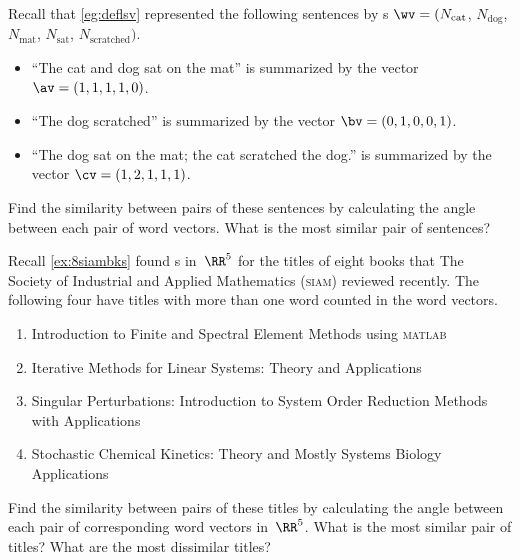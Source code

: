 \begin{exercise}  
Recall that \cref{eg:deflsv} represented the following sentences by s \(\wv=(N_{\text{cat}}\), \(N_{\text{dog}}\), \(N_{\text{mat}}\), \(N_{\text{sat}}\), \(N_{\text{scratched}})\).
\begin{itemize}
\item ``The cat and dog sat on the mat'' is summarized by the vector \(\av=(1,1,1,1,0)\).
\item ``The dog scratched'' is summarized by the vector \(\bv=(0,1,0,0,1)\).
\item  ``The dog sat on the mat; the cat scratched the dog.'' is summarized by the vector \(\cv=(1,2,1,1,1)\).
\end{itemize}
Find the similarity between pairs of these sentences by calculating the angle between each pair of word vectors.  
What is the most similar pair of sentences?

\end{exercise}



\begin{OmitV1}
\begin{exercise}  
Recall \cref{ex:8siambks} found s in~\(\RR^5\) for the titles of eight books that The Society of Industrial and Applied Mathematics (\textsc{siam}) reviewed recently.
The following four have titles with more than one word counted in the word vectors.
\begin{enumerate}
\item Introduction to Finite and Spectral Element Methods using \textsc{matlab}
\item Iterative Methods for Linear Systems: Theory and Applications 
\item Singular Perturbations: Introduction to System Order Reduction Methods with Applications 
\item Stochastic Chemical Kinetics: Theory and Mostly Systems Biology Applications
\end{enumerate}
Find the similarity between pairs of these titles by calculating the angle between each pair of corresponding word vectors in~\(\RR^5\).  
What is the most similar pair of titles?  
What are the most dissimilar titles?

\end{exercise}
\end{OmitV1}



